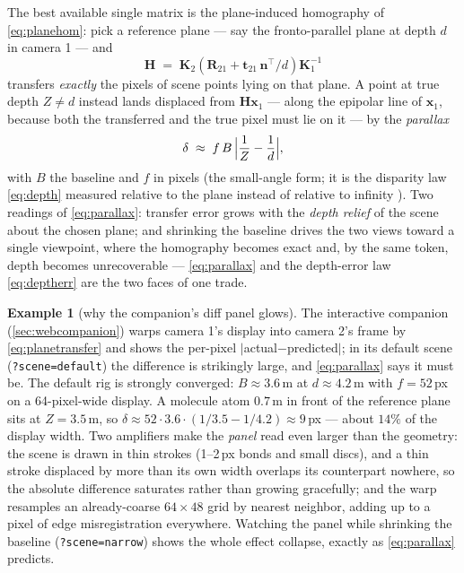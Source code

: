 \documentclass[11pt]{article}
\theoremstyle{definition}
\newtheorem{example}{Example}
\newcommand{\mat}[1]{\mathbf{#1}}
\newcommand{\vect}[1]{\mathbf{#1}}
\newcommand{\R}{\mat{R}}
\newcommand{\K}{\mat{K}}
\newcommand{\x}{\vect{x}}
\newcommand{\tv}{\vect{t}}
\newcommand{\code}[1]{\texttt{#1}}
\begin{document}
The best available single matrix is the plane-induced homography of
\eqref{eq:planehom}: pick a reference plane --- say the fronto-parallel
plane at depth $d$ in camera 1 --- and
\begin{equation}
\mat H \;=\; \K_2\!\left(\R_{21} + \tv_{21}\,\vect n^{\!\top}\!/d\right)\K_1^{-1}
\label{eq:planetransfer}
\end{equation}
transfers \emph{exactly} the pixels of scene points lying on that plane.
A point at true depth $Z\neq d$ instead lands displaced from
$\mat H\x_1$ --- along the epipolar line of $\x_1$, because both the
transferred and the true pixel must lie on it --- by the \emph{parallax}
\begin{equation}
\delta \;\approx\; f\,B\,\Bigl|\frac1Z-\frac1d\Bigr|,
\label{eq:parallax}
\end{equation}
with $B$ the baseline and $f$ in pixels (the small-angle form; it is the
disparity law \eqref{eq:depth} measured relative to the plane instead of
relative to infinity \cite{HartleyZisserman2004}). Two readings of
\eqref{eq:parallax}: transfer error grows with the \emph{depth relief}
of the scene about the chosen plane; and shrinking the baseline drives
the two views toward a single viewpoint, where the homography becomes
exact and, by the same token, depth becomes unrecoverable ---
\eqref{eq:parallax} and the depth-error law \eqref{eq:deptherr} are the
two faces of one trade.

\begin{example}[why the companion's diff panel glows]
\label{ex:parallax}
The interactive companion (\autoref{sec:webcompanion}) warps camera 1's
display into camera 2's frame by \eqref{eq:planetransfer} and shows the
per-pixel $|$actual$-$predicted$|$; in its default scene
(\code{?scene=default}) the difference is strikingly large, and
\eqref{eq:parallax} says it must be. The default rig is strongly
converged: $B\approx3.6$\,m at $d\approx4.2$\,m with $f=52$\,px on a
64-pixel-wide display. A molecule atom $0.7$\,m in front of the
reference plane sits at $Z=3.5$\,m, so
$\delta \approx 52\cdot3.6\cdot(1/3.5-1/4.2)\approx9$\,px --- about
$14\%$ of the display width. Two amplifiers make the \emph{panel} read
even larger than the geometry: the scene is drawn in thin strokes
(1--2\,px bonds and small discs), and a thin stroke displaced by more
than its own width overlaps its counterpart nowhere, so the absolute
difference saturates rather than growing gracefully; and the warp
resamples an already-coarse $64\times48$ grid by nearest neighbor,
adding up to a pixel of edge misregistration everywhere. Watching the
panel while shrinking the baseline (\code{?scene=narrow}) shows the
whole effect collapse, exactly as \eqref{eq:parallax} predicts.
\end{example}
\end{document}
